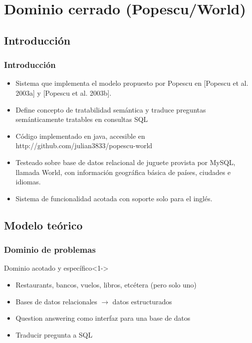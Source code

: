 
\section{Dominio cerrado (Popescu/World)}
\subsection{Introducción}
\begin{frame}
\frametitle{Introducción}
\begin{itemize}
  \item Sistema que implementa el modelo propuesto por Popescu en [Popescu et al. 2003a] y  [Popescu et al. 2003b].
  \item Define concepto de tratabilidad semántica y traduce preguntas semánticamente tratables en consultas SQL
  \item Código implementado en java, accesible en http://github.com/julian3833/popescu-world
  \item Testeado sobre base de datos relacional de juguete provista por MySQL, llamada World, con información geográfica básica de países, ciudades e idiomas.
  \item Sistema de funcionalidad acotada con soporte solo para el inglés.
\end{itemize}
\end{frame}

\subsection{Modelo teórico}

\begin{frame}
  \frametitle{Dominio de problemas}
   \begin{block}{Dominio acotado y específico}<1->
      \begin{itemize}
          \item Restaurants, bancos, vuelos, libros, etcétera (pero solo uno)
          \item Bases de datos relacionales $\rightarrow$ datos estructurados
          \item Question answering como interfaz para una base de datos
          \item Traducir pregunta a SQL
      \end{itemize}
    \end{block}
\end{frame}

